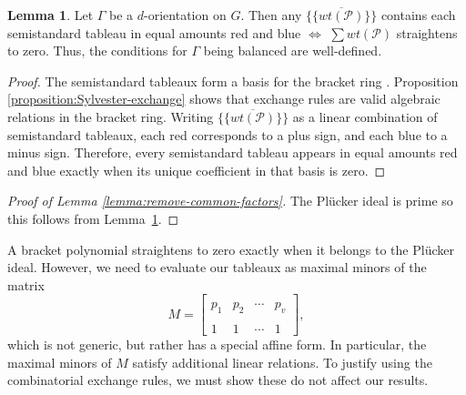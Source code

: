 \documentclass[11pt,letterpaper]{amsart}
\theoremstyle{definition}
\newtheorem{lemma}{Lemma}
\begin{document}
\begin{lemma}\label{lemma:red-blue-equiv-straighten-to-zero}
    Let $\Gamma$ be a $d$-orientation on $G$. Then any $\overline{\{\{ wt(\mathcal{P}) \}\}}$ contains each semistandard tableau in equal amounts red and blue $\iff$ $\sum wt(\mathcal{P})$ straightens to zero. Thus, the conditions for $\Gamma$ being balanced are well-defined.
\end{lemma}

\begin{proof}
    The semistandard tableaux form a basis for the bracket ring \cite[Corollary 3.1.9, page 82]{bernd-algorithms}. Proposition \ref{proposition:Sylvester-exchange} shows that exchange rules are valid algebraic relations in the bracket ring. Writing $\overline{\{\{ wt(\mathcal{P}) \}\}}$ as a linear combination of semistandard tableaux, each red corresponds to a plus sign, and each blue to a minus sign. Therefore, every semistandard tableau appears in equal amounts red and blue exactly when its unique coefficient in that basis is zero.
\end{proof}

\begin{proof}[Proof of Lemma \ref{lemma:remove-common-factors}]
    The Pl\"ucker ideal is prime so this follows from Lemma~\ref{lemma:red-blue-equiv-straighten-to-zero}.
\end{proof}

A bracket polynomial straightens to zero exactly when it belongs to the Pl\"ucker ideal.  However, we need to evaluate our tableaux as maximal minors of the matrix
\begin{equation*}
    M = \begin{bmatrix}
        & & & \\
        p_1 & p_2 & \cdots & p_v\\
        & & & \\
        1 & 1 & \cdots & 1
    \end{bmatrix},
\end{equation*}
which is not generic, but rather has a special affine form. In particular, the maximal minors of $M$ satisfy additional linear relations. To justify using the combinatorial exchange rules, we must show these do not affect our results. 
\end{document}
